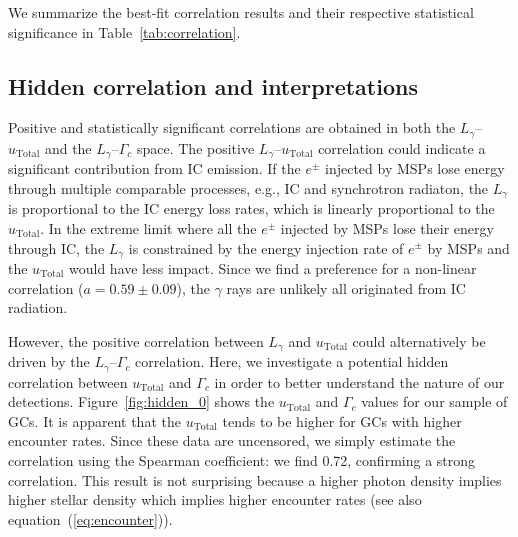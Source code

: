 \documentclass[doublespace,draft,nopageskip]{VTthesis} %
\begin{document}
We summarize the best-fit correlation results and their respective statistical significance in Table~\ref{tab:correlation}.

\subsection{Hidden correlation and interpretations}\label{sec:hidden}

Positive and statistically significant correlations are obtained in both the $L_\gamma$--$u_\mathrm{Total}$ and the $L_\gamma$--$\Gamma_c$ space. The positive $L_\gamma$--$u_\mathrm{Total}$ correlation could indicate a  significant contribution from IC emission. If the $e^\pm$ injected by MSPs lose energy through multiple comparable processes, e.g., IC and synchrotron radiaton, the $L_\gamma$ is proportional to the IC energy loss rates, which is linearly proportional to the $u_\mathrm{Total}$. In the extreme limit where all the $e^\pm$ injected by MSPs lose their energy through IC, the $L_\gamma$ is constrained by the energy injection rate of $e^\pm$ by MSPs and the $u_\mathrm{Total}$ would have less impact. Since we find a preference for a non-linear correlation ($a= 0.59 \pm 0.09$), the $\gamma$ rays are unlikely all originated from IC radiation.

However, the positive correlation between $L_\gamma$ and $u_\mathrm{Total}$ could alternatively be driven by the $L_\gamma$--$\Gamma_c$ correlation. Here, we investigate a potential hidden correlation between $u_\mathrm{Total}$ and $\Gamma_c$ in order to better understand the nature of our detections. Figure~\ref{fig:hidden_0} shows the $u_\mathrm{Total}$ and $\Gamma_c$ values for our sample of GCs. It is apparent that the $u_\mathrm{Total}$ tends to be higher for GCs with higher encounter rates. Since these data are uncensored, we simply estimate the correlation using the Spearman coefficient: we find 0.72, confirming a strong correlation. This result is not surprising because a higher photon density implies higher stellar density which implies higher encounter rates (see also equation~(\ref{eq:encounter})).
\end{document}
